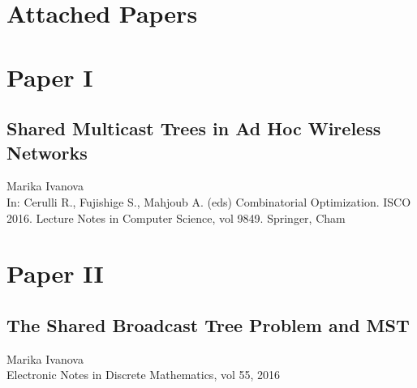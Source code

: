 \chapter{Attached Papers}


\chapter*{Paper I}
\section{Shared Multicast Trees in Ad Hoc Wireless Networks}

\noindent Marika Ivanova\\

\noindent In: Cerulli R., Fujishige S., Mahjoub A. (eds) Combinatorial Optimization. ISCO 2016. Lecture Notes in Computer Science, vol 9849. Springer, Cham
\cleardoublepage


\chapter*{Paper II}
\section{The Shared Broadcast Tree Problem and MST}

\noindent Marika Ivanova\\

\noindent Electronic Notes in Discrete Mathematics, vol 55, 2016
\cleardoublepage

